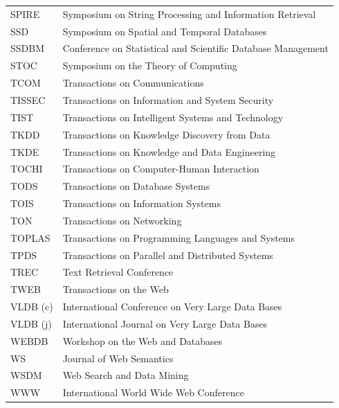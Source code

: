 \documentclass[msc]{ppgccufmg}
\begin{document}
\begin{appendices}
\begin{table}[h]
\begin{tabular}{ll}
SPIRE					&		Symposium on String Processing and Information Retrieval  \\ 
SSD					&		Symposium on Spatial and Temporal Databases  \\ 
SSDBM					&		Conference on Statistical and Scientific Database Management  \\ 
STOC					&		Symposium on the Theory of Computing  \\ 
TCOM					&		Transactions on Communications  \\ 
TISSEC					&		Transactions on Information and System Security  \\ 
TIST					&		Transactions on Intelligent Systems and Technology  \\ 
TKDD					&		Transactions on Knowledge Discovery from Data  \\ 
TKDE					&		Transactions on Knowledge and Data Engineering  \\ 
TOCHI					&		Transactions on Computer-Human Interaction  \\ 
TODS					&		Transactions on Database Systems  \\ 
TOIS					&		Transactions on Information Systems  \\ 
TON					&		Transactions on Networking  \\ 
TOPLAS					&		Transactions on Programming Languages and Systems  \\ 
TPDS					&		Transactions on Parallel and Distributed Systems  \\ 
TREC					&		Text Retrieval Conference  \\ 
TWEB					&		Transactions on the Web  \\ 
VLDB (c)					&		International Conference on Very Large Data Bases  \\ 
VLDB (j)					&		International Journal on Very Large Data Bases  \\ 
WEBDB					&		Workshop on the Web and Databases  \\ 
WS					&		Journal of Web Semantics  \\ 
WSDM					&		Web Search and Data Mining  \\ 
WWW					&		International World Wide Web Conference  \\ 
\bottomrule
\end{tabular}
\end{table}


\chapter*{}
\ \\

\end{appendices}    
\end{document}
